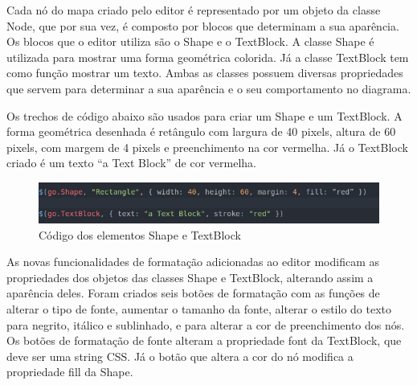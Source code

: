 \documentclass[
	12pt,				%
	openright,			%
	oneside,			%
	a4paper,			%
	english,			%
	french,				%
	spanish,			%
	brazil				%
	]{abntex2}
\begin{document}
Cada nó do mapa criado pelo editor é representado por um objeto da classe Node, que por sua vez, é composto por blocos que determinam a sua aparência. Os blocos que o editor utiliza são o Shape e o TextBlock. A classe Shape é utilizada para mostrar uma forma geométrica colorida. Já a classe TextBlock tem como função mostrar um texto. Ambas as classes possuem diversas propriedades que servem para determinar a sua aparência e o seu comportamento no diagrama.

Os trechos de código abaixo são usados para criar um Shape e um TextBlock. A forma geométrica  desenhada é retângulo com largura de 40 pixels, altura de 60 pixels, com margem de 4 pixels e preenchimento na cor vermelha. Já o TextBlock criado é um texto “a Text Block” de cor vermelha.

\begin{figure}[htb]
	\caption{\label{fig_gojselements} Código dos elementos Shape e TextBlock}
	\begin{center}
		\includegraphics[scale=0.6]{gojselements.png}
	\end{center}
\end{figure}

As novas funcionalidades de formatação adicionadas ao editor modificam as propriedades dos objetos das classes Shape e TextBlock, alterando assim a aparência deles. Foram criados seis botões de formatação com as funções de alterar o tipo de fonte, aumentar o tamanho da fonte, alterar o estilo do texto para negrito, itálico e sublinhado, e para alterar a cor de preenchimento dos nós. Os botões de formatação de fonte alteram a propriedade font da TextBlock, que deve ser uma string  CSS. Já o botão que altera a cor do nó modifica a propriedade fill da Shape.
\end{document}
